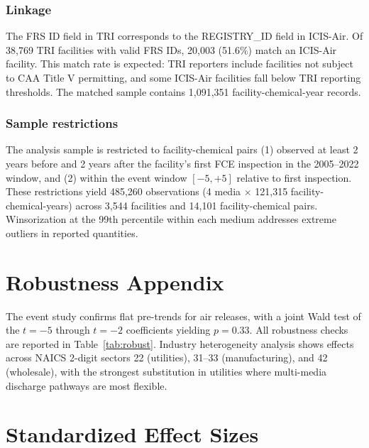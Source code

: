 \documentclass[12pt]{article}
\begin{document}
\subsubsection*{Linkage} The FRS ID field in TRI corresponds to the REGISTRY\_ID field in ICIS-Air. Of 38,769 TRI facilities with valid FRS IDs, 20,003 (51.6\%) match an ICIS-Air facility. This match rate is expected: TRI reporters include facilities not subject to CAA Title V permitting, and some ICIS-Air facilities fall below TRI reporting thresholds. The matched sample contains 1,091,351 facility-chemical-year records.

\subsubsection*{Sample restrictions} The analysis sample is restricted to facility-chemical pairs (1) observed at least 2 years before and 2 years after the facility's first FCE inspection in the 2005--2022 window, and (2) within the event window $[-5, +5]$ relative to first inspection. These restrictions yield 485,260 observations (4 media $\times$ 121,315 facility-chemical-years) across 3,544 facilities and 14,101 facility-chemical pairs. Winsorization at the 99th percentile within each medium addresses extreme outliers in reported quantities.

\section{Robustness Appendix}

The event study confirms flat pre-trends for air releases, with a joint Wald test of the $t = -5$ through $t = -2$ coefficients yielding $p = 0.33$. All robustness checks are reported in Table~\ref{tab:robust}. Industry heterogeneity analysis shows effects across NAICS 2-digit sectors 22 (utilities), 31--33 (manufacturing), and 42 (wholesale), with the strongest substitution in utilities where multi-media discharge pathways are most flexible.


\section{Standardized Effect Sizes}
\label{sec:sde}


\end{document}
